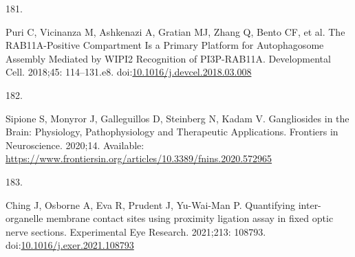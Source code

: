 \documentclass[
  12pt,
  a4paper,
]{book}
\newlength{\cslhangindent}
\newlength{\csllabelwidth}
\newlength{\cslentryspacingunit} %
\newenvironment{CSLReferences}[2] %
 {%
  \setlength{\parindent}{0pt}
  \ifodd #1
  \let\oldpar\par
  \def\par{\hangindent=\cslhangindent\oldpar}
  \fi
  \setlength{\parskip}{#2\cslentryspacingunit}
 }%
 {}
\newcommand{\CSLLeftMargin}[1]{\parbox[t]{\csllabelwidth}{#1}}
\newcommand{\CSLRightInline}[1]{\parbox[t]{\linewidth - \csllabelwidth}{#1}\break}
\begin{document}
\begin{CSLReferences}{0}{0}
\leavevmode{}%
\CSLLeftMargin{181. }%
\CSLRightInline{Puri C, Vicinanza M, Ashkenazi A, Gratian MJ, Zhang Q, Bento CF, et al. The {RAB11A-Positive Compartment Is} a {Primary Platform} for {Autophagosome Assembly Mediated} by {WIPI2 Recognition} of {PI3P-RAB11A}. Developmental Cell. 2018;45: 114--131.e8. doi:\href{https://doi.org/10.1016/j.devcel.2018.03.008}{10.1016/j.devcel.2018.03.008}}

\leavevmode{}%
\CSLLeftMargin{182. }%
\CSLRightInline{Sipione S, Monyror J, Galleguillos D, Steinberg N, Kadam V. Gangliosides in the {Brain}: {Physiology}, {Pathophysiology} and {Therapeutic Applications}. Frontiers in Neuroscience. 2020;14. Available: \url{https://www.frontiersin.org/articles/10.3389/fnins.2020.572965}}

\leavevmode{}%
\CSLLeftMargin{183. }%
\CSLRightInline{Ching J, Osborne A, Eva R, Prudent J, Yu-Wai-Man P. Quantifying inter-organelle membrane contact sites using proximity ligation assay in fixed optic nerve sections. Experimental Eye Research. 2021;213: 108793. doi:\href{https://doi.org/10.1016/j.exer.2021.108793}{10.1016/j.exer.2021.108793}}

\end{CSLReferences}
\end{document}
